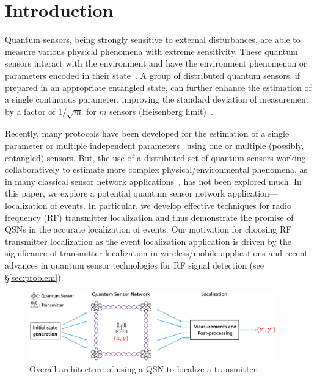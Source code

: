 \section{Introduction}

Quantum sensors, being strongly sensitive to external disturbances, are able to measure various physical phenomena with extreme sensitivity.
These quantum sensors interact with the environment and have the environment phenomenon or parameters encoded in their state~\cite{RevModPhys.quantumsensing}.
A group of distributed quantum sensors, if prepared in an appropriate entangled state, can further enhance the estimation of a single continuous parameter, improving the standard deviation of measurement by a factor of $1/\sqrt{m}$ for $m$ sensors (Heisenberg limit)~\cite{Giovannetti_2011}.

Recently, many protocols have been developed for the estimation of a single 
parameter or multiple independent parameters~\cite{Giovannetti_2011,Proctor_2018} using one or multiple (possibly, entangled) sensors. 
But, the use of a distributed set of quantum sensors working collaboratively 
to estimate more complex physical/environmental phenomena, as in many classical
sensor network applications~\cite{tsn17-water, sensys10-health,mobicom03-sensor}, 
has not been explored much.
In this paper, we explore a potential quantum sensor network application--- localization of events.
In particular, we develop effective techniques 
for radio frequency (RF) transmitter localization and thus demonstrate the promise of QSNs in the accurate localization of events. Our motivation for choosing 
RF transmitter localization as the event localization 
application is driven by the significance of transmitter localization
in  wireless/mobile applications and recent advances in quantum sensor
technologies for RF signal detection (see \S\ref{sec:problem}).

\begin{figure}[t]
    \centering
    \includegraphics[width=0.95\textwidth]{chapters/qce/figures/overall.png}
    \caption{Overall architecture of using a QSN to localize a transmitter. 
    }
    \label{fig:quantumoverall}
\end{figure}

